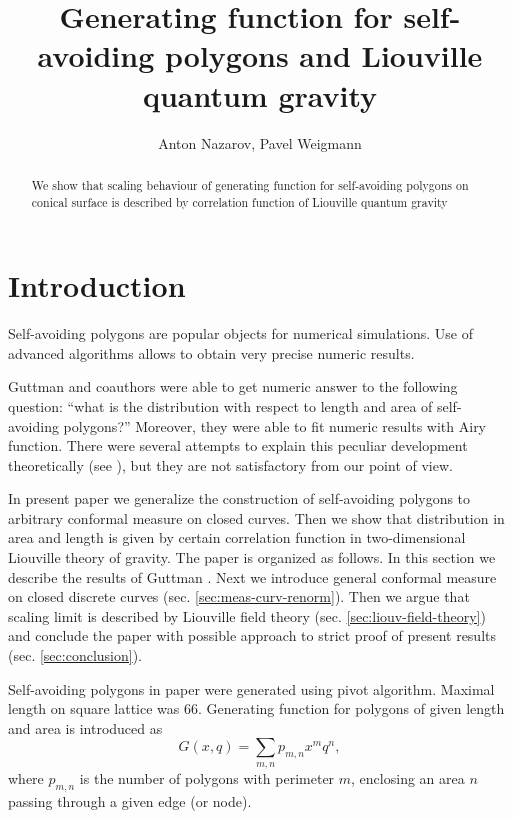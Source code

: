 \documentclass[12pt]{article}
\begin{document}
\title{Generating function for self-avoiding polygons and Liouville quantum gravity}
\author{Anton Nazarov, Pavel Weigmann}%

\maketitle

\begin{abstract}
  We show that scaling behaviour of generating function for self-avoiding polygons on conical
  surface is described by correlation function of Liouville quantum gravity
\end{abstract}

\section{Introduction}
\label{sec:introduction}

Self-avoiding polygons are popular objects for numerical simulations. Use of advanced algorithms
allows to obtain very precise numeric results. 

Guttman and coauthors \cite{richard2001scaling} were able to get numeric answer to the following
question: ``what is the distribution with respect to length and area of self-avoiding polygons?''
Moreover, they were able to fit numeric results with Airy function. There were several attempts to
explain this peculiar development theoretically (see
\cite{cardy2003crossover,cardy2003exact,cardy2001exact}), but they are not satisfactory from our
point of view.

In present paper we generalize the construction of self-avoiding polygons to arbitrary conformal
measure on closed curves. Then we show that distribution in area and length is given by certain
correlation function in two-dimensional Liouville theory of gravity. The paper is organized as
follows. In this section we describe the results of Guttman \cite{richard2001scaling}. Next we
introduce general conformal measure on closed discrete curves (sec. \ref{sec:meas-curv-renorm}).
Then we argue that scaling limit is described by Liouville field theory (sec.
\ref{sec:liouv-field-theory}) and conclude the paper with possible approach to strict proof of
present results (sec. \ref{sec:conclusion}).

Self-avoiding polygons in paper \cite{richard2001scaling} were generated using pivot algorithm.
Maximal length on square lattice was 66. Generating function for polygons of given length and area
is introduced as
\begin{equation}
  \label{eq:75}
  G(x,q)=\sum_{m,n} p_{m,n} x^{m} q^{n},
\end{equation}
where $p_{m,n}$ is the number of polygons with perimeter $m$, enclosing an area $n$ passing through
a given edge (or node). 
\end{document}
